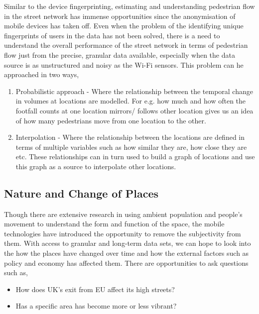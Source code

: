 Similar to the device fingerprinting, estimating and understanding pedestrian flow in the street network has immense opportunities since the anonymisation of mobile devices has taken off.
Even when the problem of the identifying unique fingerprints of users in the data has not been solved, there is a need to understand the overall performance of the street network in terms of pedestrian flow just from the precise, granular data available, especially when the data source is as unstructured and noisy as the Wi-Fi sensors.
This problem can he approached in two ways,
\begin{enumerate}
  \itemsep-0.25em
  \item Probabilistic approach - Where the relationship between the temporal change in volumes at locations are modelled.
  For e.g. how much and how often the footfall counts at one location mirrors/ follows other location gives us an idea of how many pedestrians move from one location to the other.
  \item Interpolation - Where the relationship between the locations are defined in terms of multiple variables such as how similar they are, how close they are etc.
  These relationships can in turn used to build a graph of locations and use this graph as a source to interpolate other locations.
\end{enumerate}

\subsection{Nature and Change of Places}

Though there are extensive research in using ambient population and people's movement to understand the form and function of the space, the mobile technologies have introduced the opportunity to remove the subjectivity from them.
With access to granular and long-term data sets, we can hope to look into the how the places have changed over time and how the external factors such as policy and economy has affected them.
There are opportunities to ask questions such as,


\begin{itemize}
  \itemsep-0.25em
  \item How does UK's exit from EU affect its high streets?
  \item Has a specific area has become more or less vibrant?
\end{itemize}

